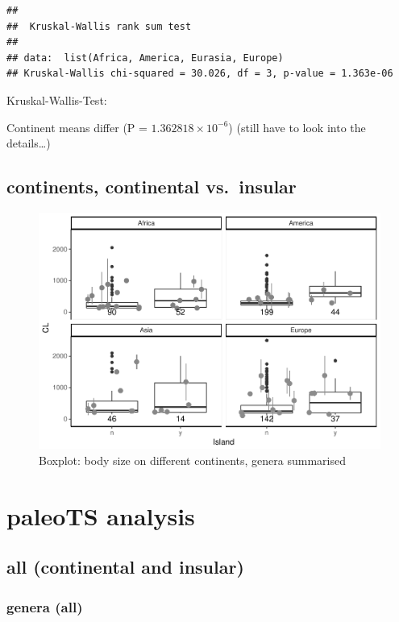 \documentclass[]{article}
\begin{document}
\begin{verbatim}
## 
##  Kruskal-Wallis rank sum test
## 
## data:  list(Africa, America, Eurasia, Europe)
## Kruskal-Wallis chi-squared = 30.026, df = 3, p-value = 1.363e-06
\end{verbatim}

Kruskal-Wallis-Test:

Continent means differ (P = \(1.362818\times 10^{-6}\)) (still have to
look into the details\ldots{})

\newpage

\subsection{continents, continental
vs.~insular}\label{continents-continental-vs.insular}

\begin{figure}[htbp]
\centering
\includegraphics{MA_JJ_files/figure-latex/BPConCI-1.pdf}
\caption{Boxplot: body size on different continents, genera summarised}
\end{figure}

\newpage

\section{paleoTS analysis}\label{paleots-analysis}

\subsection{all (continental and
insular)}\label{all-continental-and-insular}

\subsubsection{genera (all)}\label{genera-all}
\end{document}
